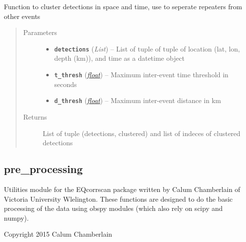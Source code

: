 \documentclass[a4paper,10pt,english]{sphinxmanual}
\begin{document}
\begin{fulllineitems}
\label{submodules/utils.clustering:clustering.space_time_cluster}
Function to cluster detections in space and time, use to seperate repeaters
from other events
\begin{quote}\begin{description}
\item[{Parameters}] \leavevmode\begin{itemize}
\item {} 
\textbf{\texttt{detections}} (\emph{List}) -- List of tuple of tuple of location (lat, lon, depth (km)),            and time as a datetime object

\item {} 
\textbf{\texttt{t\_thresh}} (\href{https://docs.python.org/library/functions.html\#float}{\emph{float}}) -- Maximum inter-event time threshold in seconds

\item {} 
\textbf{\texttt{d\_thresh}} (\href{https://docs.python.org/library/functions.html\#float}{\emph{float}}) -- Maximum inter-event distance in km

\end{itemize}

\item[{Returns}] \leavevmode
List of tuple (detections, clustered) and list of indeces of            clustered detections

\end{description}\end{quote}

\end{fulllineitems}



\subsection{pre\_processing}
\label{submodules/utils.pre_processing:pre-processing}\label{submodules/utils.pre_processing::doc}\label{submodules/utils.pre_processing:module-pre_processing}
Utilities module for the EQcorrscan package written by Calum Chamberlain of
Victoria University Wlelington.  These functions are designed to do the basic
processing of the data using obspy modules (which also rely on scipy and numpy).

Copyright 2015 Calum Chamberlain
\end{document}

